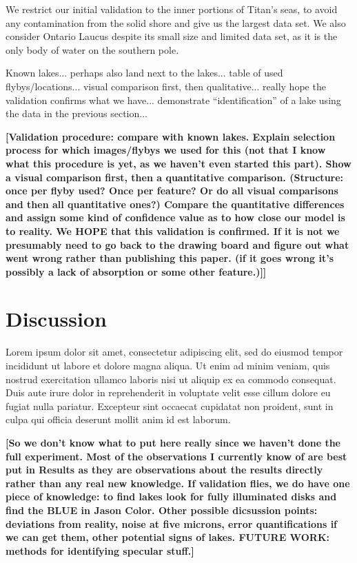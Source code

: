 \documentclass[twocolumn,linenumbers]{aastex631}
\begin{document}
We restrict our initial validation to the inner portions of Titan's seas, to avoid any contamination from the solid shore and give us the largest data set. We also consider Ontario Laucus despite its small size and limited data set, as it is the only body of water on the southern pole. 

\color{blue}Known lakes... perhaps also land next to the lakes... table of used flybys/locations... visual comparison first, then qualitative... really hope the validation confirms what we have... demonstrate ``identification'' of a lake using the data in the previous section... \color{black}

\textbf{\color{red}[Validation procedure: compare with known lakes. Explain selection process for which images/flybys we used for this (not that I know what this procedure is yet, as we haven't even started this part). Show a visual comparison first, then a quantitative comparison. (Structure: once per flyby used? Once per feature? Or do all visual comparisons and then all quantitative ones?) Compare the quantitative differences and assign some kind of confidence value as to how close our model is to reality. We HOPE that this validation is confirmed. If it is not we presumably need to go back to the drawing board and figure out what went wrong rather than publishing this paper. (if it goes wrong it's possibly a lack of absorption or some other feature.)]]\color{black}}

\section{Discussion} \label{sec:discussion}

Lorem ipsum dolor sit amet, consectetur adipiscing elit, sed do eiusmod tempor incididunt ut labore et dolore magna aliqua. Ut enim ad minim veniam, quis nostrud exercitation ullamco laboris nisi ut aliquip ex ea commodo consequat. Duis aute irure dolor in reprehenderit in voluptate velit esse cillum dolore eu fugiat nulla pariatur. Excepteur sint occaecat cupidatat non proident, sunt in culpa qui officia deserunt mollit anim id est laborum.

\textbf{\color{red}[So we don't know what to put here really since we haven't done the full experiment. Most of the observations I currently know of are best put in Results as they are observations about the results directly rather than any real new knowledge. If validation flies, we do have one piece of knowledge: to find lakes look for fully illuminated disks and find the BLUE in Jason Color. Other possible dicsussion points: deviations from reality, noise at five microns, error quantifications if we can get them, other potential signs of lakes. FUTURE WORK: methods for identifying specular stuff.]
\color{black}}
\end{document}
